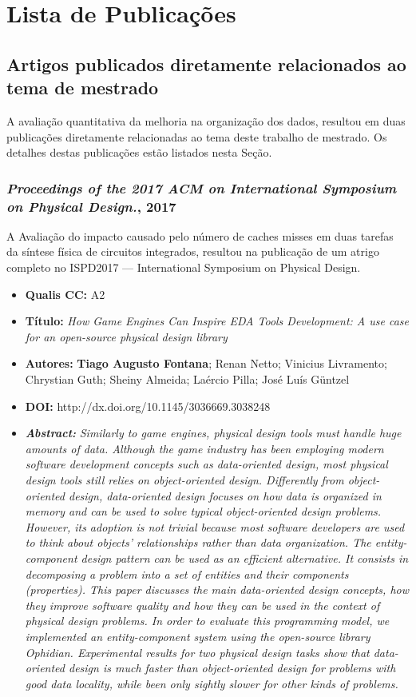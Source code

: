 \chapter{Lista de Publicações}
\label{ap:producoes}
\section{Artigos publicados diretamente relacionados ao tema de mestrado}

A avaliação quantitativa da melhoria na organização dos dados, resultou em duas publicações diretamente relacionadas ao tema deste trabalho de mestrado. Os detalhes destas publicações estão listados nesta Seção.

\subsection{\textit{Proceedings of the 2017 ACM on International Symposium on Physical Design.}, 2017}

A Avaliação do impacto causado pelo número de caches misses em duas tarefas da síntese física de circuitos integrados, resultou na publicação de um atrigo completo no ISPD2017 --- International Symposium on Physical Design. 

\begin{itemize}
\item \textbf{Qualis CC:} A2
\item \textbf{Título:} \textit{How Game Engines Can Inspire EDA Tools Development: A use case for an open-source physical design library}
\item \textbf{Autores:}  \textbf{Tiago Augusto Fontana}; Renan Netto; Vinicius Livramento; Chrystian Guth; Sheiny Almeida; Laércio Pilla; José Luís Güntzel
\item \textbf{DOI:} http://dx.doi.org/10.1145/3036669.3038248
\item \textbf{\textit{Abstract:}} \emph{Similarly to game engines, physical design tools must handle huge amounts of data. Although the game industry has been employing modern software development concepts such as data-oriented design, most physical design tools still relies on object-oriented design. Differently from object-oriented design, data-oriented design focuses on how data is organized in memory and can be used to solve typical object-oriented design problems. However, its adoption is not trivial because most software developers are used to think about objects' relationships rather than data organization. The entity-component design pattern can be used as an efficient alternative. It consists in decomposing a problem into a set of entities and their components (properties). This paper discusses the main data-oriented design concepts, how they improve software quality and how they can be used in the context of physical design problems. In order to evaluate this programming model, we implemented an entity-component system using the open-source library Ophidian. Experimental results for two physical design tasks show that data-oriented design is much faster than object-oriented design for problems with good data locality, while been only sightly slower for other kinds of problems.}
\end{itemize}


